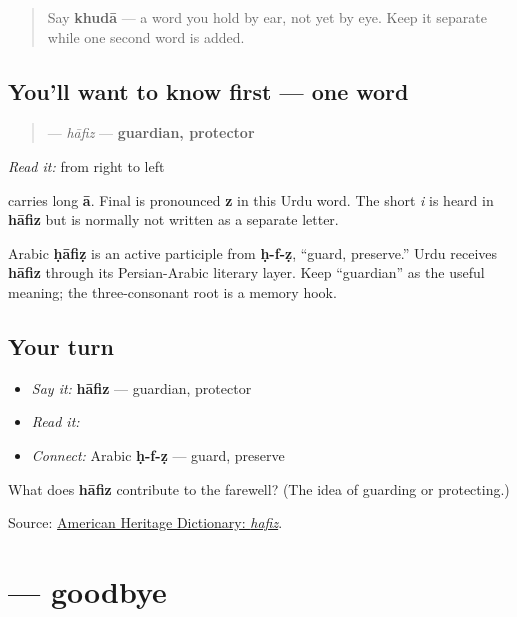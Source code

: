 \begin{quote}
Say \textbf{khudā} — a word you hold by ear, not yet by eye. Keep it separate while one second word is added.
\end{quote}

\subsection*{You'll want to know first — one word}
\begin{quote}
\textbf{} — \emph{hāfiz} — \textbf{guardian, protector}
\end{quote}

\emph{Read it:} \textbf{   } from right to left

\textbf{} carries long \textbf{ā}. Final \textbf{} is pronounced \textbf{z} in this Urdu word. The short \emph{i} is heard in \textbf{hāfiz} but is normally not written as a separate letter.

\begin{cousinweb}
Arabic \textbf{ḥāfiẓ} is an active participle from \textbf{ḥ-f-ẓ}, “guard, preserve.” Urdu receives \textbf{hāfiz} through its Persian-Arabic literary layer. Keep “guardian” as the useful meaning; the three-consonant root is a memory hook.
\end{cousinweb}

\subsection*{Your turn}
\begin{itemize}
\raggedright
  \item \emph{Say it:} \textbf{hāfiz} — guardian, protector
  \item \emph{Read it:} \textbf{}
  \item \emph{Connect:} Arabic \textbf{ḥ-f-ẓ} — guard, preserve
\end{itemize}

\begin{tcolorbox}[breakable,colback=teal!4,colframe=teal!35!black,title={Before you move on}]
What does \textbf{hāfiz} contribute to the farewell? (The idea of guarding or protecting.)

Source: \href{https://www.ahdictionary.com/word/search.html?q=hafiz}{American Heritage Dictionary: \emph{hafiz}}.
\end{tcolorbox}
\section[\texorpdfstring{\ur{خدا} \ur{حافظ} (khudā hāfiz)}{خدا حافظ (khudā hāfiz)}]{  — goodbye}

